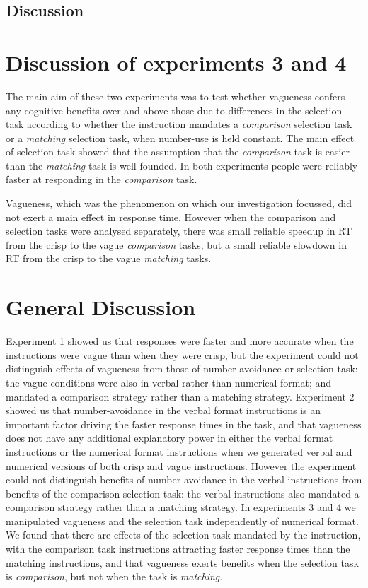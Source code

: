 \documentclass[graybox,envcountchap,sectrefs%
,footinfo
]{svmono}
\begin{document}
\subsection{Discussion}
\textcolor{red}{\lipsum[2]}
\section{Discussion of experiments 3 and 4}

The main aim of these two experiments was to test whether vagueness confers any cognitive benefits over and above those due to differences in the selection task according to whether the instruction mandates a \emph{comparison} selection task or a \emph{matching} selection task, when number-use is held constant.  The main effect of selection task showed that the assumption that the \emph{comparison} task is easier than the \emph{matching} task is well-founded. In both experiments people were reliably faster at responding in the \emph{comparison} task. 

Vagueness, which was the phenomenon  on which our investigation focussed, did not exert a main effect in response time. However when the comparison and selection tasks were analysed separately, there was small reliable speedup in RT from the crisp to the vague \emph{comparison} tasks, but a small reliable slowdown in RT from the crisp to the vague \emph{matching} tasks. 

\section{General Discussion}

Experiment 1 showed us that responses were faster and more accurate when the instructions were vague than when they were crisp, but the experiment could not distinguish effects of vagueness from those of number-avoidance or selection task: the vague conditions were also in verbal rather than numerical format; and mandated a comparison strategy rather than a matching strategy.  Experiment 2 showed us that number-avoidance in the verbal format instructions is an important factor driving the faster response times in the task, and that vagueness does not have any additional explanatory power in either the verbal format instructions or the numerical format instructions when we generated verbal and numerical versions of both crisp and vague instructions. However the experiment could not distinguish benefits of number-avoidance in the verbal instructions from benefits of the comparison selection task: the verbal instructions also mandated a comparison strategy rather than a matching strategy. In experiments 3 and 4 we manipulated vagueness and the selection task independently of numerical format. We found that there are effects of the selection task mandated by the instruction, with the comparison task instructions attracting faster response times than the matching instructions, and that vagueness exerts benefits when the selection task is \emph{comparison}, but not when the task is \emph{matching}.
\end{document}
